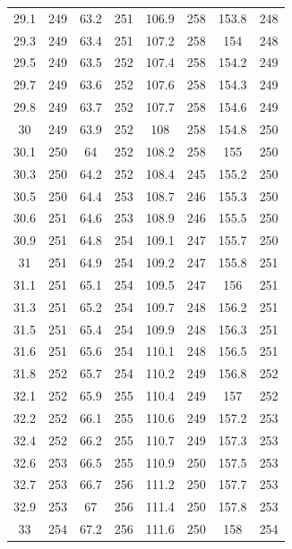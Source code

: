 \documentclass[12pt]{ctexart}
\numberwithin{equation}{section}
\begin{document}
\begin{longtable}{cc|cc|cc|cc}
29.1  &  249  &  63.2  &  251  &  106.9  &  258  &  153.8  &  248  \\
29.3  &  249  &  63.4  &  251  &  107.2  &  258  &  154  &  248  \\
29.5  &  249  &  63.5  &  252  &  107.4  &  258  &  154.2  &  249  \\
29.7  &  249  &  63.6  &  252  &  107.6  &  258  &  154.3  &  249  \\
29.8  &  249  &  63.7  &  252  &  107.7  &  258  &  154.6  &  249  \\
30  &  249  &  63.9  &  252  &  108  &  258  &  154.8  &  250  \\
30.1  &  250  &  64  &  252  &  108.2  &  258  &  155  &  250  \\
30.3  &  250  &  64.2  &  252  &  108.4  &  245  &  155.2  &  250  \\
30.5  &  250  &  64.4  &  253  &  108.7  &  246  &  155.3  &  250  \\
30.6  &  251  &  64.6  &  253  &  108.9  &  246  &  155.5  &  250  \\
30.9  &  251  &  64.8  &  254  &  109.1  &  247  &  155.7  &  250  \\
31  &  251  &  64.9  &  254  &  109.2  &  247  &  155.8  &  251  \\
31.1  &  251  &  65.1  &  254  &  109.5  &  247  &  156  &  251  \\
31.3  &  251  &  65.2  &  254  &  109.7  &  248  &  156.2  &  251  \\
31.5  &  251  &  65.4  &  254  &  109.9  &  248  &  156.3  &  251  \\
31.6  &  251  &  65.6  &  254  &  110.1  &  248  &  156.5  &  251  \\
31.8  &  252  &  65.7  &  254  &  110.2  &  249  &  156.8  &  252  \\
32.1  &  252  &  65.9  &  255  &  110.4  &  249  &  157  &  252  \\
32.2  &  252  &  66.1  &  255  &  110.6  &  249  &  157.2  &  253  \\
32.4  &  252  &  66.2  &  255  &  110.7  &  249  &  157.3  &  253  \\
32.6  &  253  &  66.5  &  255  &  110.9  &  250  &  157.5  &  253  \\
32.7  &  253  &  66.7  &  256  &  111.2  &  250  &  157.7  &  253  \\
32.9  &  253  &  67  &  256  &  111.4  &  250  &  157.8  &  253  \\
33  &  254  &  67.2  &  256  &  111.6  &  250  &  158  &  254  \\

\end{longtable}
\end{document}
